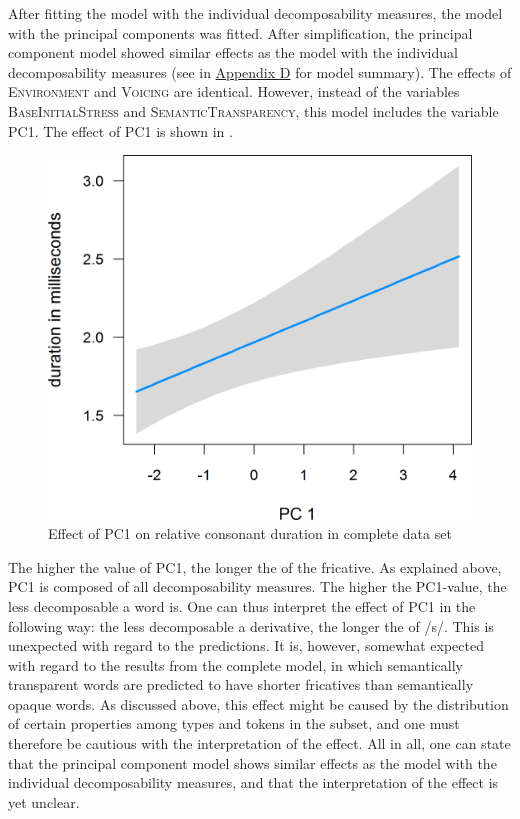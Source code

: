 After fitting the model with the individual decomposability measures, the model with the principal components was fitted. After simplification, the principal component model showed similar effects as the model with the individual decomposability measures (see  in \hyperref[Appendix D: model summaries corpus]{Appendix D} for model summary). The effects of \textsc{Environment} and \textsc{Voicing} are identical. However, instead of the variables \textsc{BaseInitialStress} and \textsc{SemanticTransparency}, this model includes the variable \textsc{PC1}. 
The effect of \textsc{PC1} is shown in . 


\begin{figure}
	\includegraphics [scale=0.4] {images/Corpus/disPCAbsPC4.png}
	\caption{Effect of PC1 on relative consonant duration in complete data set}
	\label{fig:PC1 dis Corpus}
\end{figure}


The higher the value of \textsc{PC1}, the longer the  of the fricative. As explained above, \textsc{PC1} is composed of all decomposability measures. The higher the \textsc{PC1}-value, the less decomposable a word is.
 One can thus interpret the effect of \textsc{PC1} in the following way: the less decomposable a derivative, the longer the  of /s/. This is unexpected with regard to the  predictions. It is, however, somewhat expected with regard to the results from the complete  model, in which semantically transparent words are predicted to have shorter fricatives than semantically opaque words. As discussed above, this effect might be caused by the distribution of certain properties among types and tokens in the subset, and one must therefore be cautious with the interpretation of the effect. All in all, one can state that the principal component model shows similar effects as the model with the individual decomposability measures, and that the interpretation of the  effect is yet unclear.

